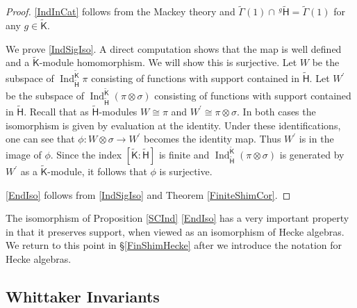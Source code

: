\documentclass[10pt, letterpaper]{amsart}
\theoremstyle{plain}
\theoremstyle{definition}
\numberwithin{equation}{section}
\newcommand{\Ind}{\operatorname{Ind}}
\newcommand{\Kf}{\mathsf{K}}
\newcommand{\Gammaf}{\mathsf{\Gamma}}
\newcommand{\Hft}{\widetilde{\mathsf{H}}}
\begin{document}
\begin{proof}
	\eqref{IndInCat} follows from the Mackey theory and $\widetilde{{\Gammaf}}(1)\cap \,^{g}\Hft=\widetilde{{\Gammaf}}(1)$ for any $g\in \widetilde{{\Kf}}$.
	
	We prove \eqref{IndSigIso}. A direct computation shows that the map is well defined and a $\widetilde{{\Kf}}$-module homomorphism. We will show this is surjective. Let $W$ be the subspace of $\Ind_{\Hft}^{\widetilde{{\Kf}}}\pi$ consisting of functions with support contained in $\Hft$. Let $W^{\prime}$ be the subspace of $\Ind_{\Hft}^{\widetilde{{\Kf}}}(\pi\otimes \sigma)$ consisting of functions with support contained in $\Hft$. Recall that as $\Hft$-modules $W\cong \pi$ and $W^{\prime}\cong \pi\otimes \sigma$. In both cases the isomorphism is given by evaluation at the identity. Under these identifications, one can see that $\phi:W\otimes \sigma\rightarrow W^{\prime}$ becomes the identity map. Thus $W^{\prime}$ is in the image of $\phi$. Since the index $[\widetilde{{\Kf}}:\Hft]$ is finite and $\Ind_{\Hft}^{\widetilde{{\Kf}}}(\pi\otimes \sigma)$ is generated by $W^{\prime}$ as a $\widetilde{{\Kf}}$-module, it follows that $\phi$ is surjective. 
	
	
	\eqref{EndIso} follows from \eqref{IndSigIso} and Theorem \ref{FiniteShimCor}. 
\end{proof}

The isomorphism of Proposition \ref{SCInd} \eqref{EndIso} has a very important property in that it preserves support, when viewed as an isomorphism of Hecke algebras. We return to this point in \S \ref{FinShimHecke} after we introduce the notation for Hecke algebras.  


\subsection{Whittaker Invariants}\label{SS:WhitInvar}
\end{document}
